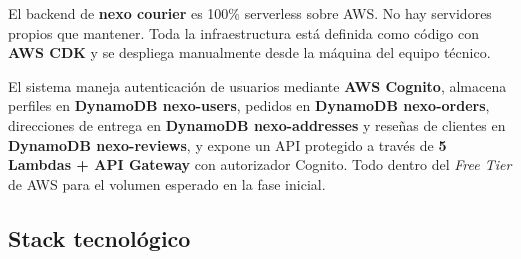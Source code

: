 \documentclass[12pt,a4paper]{article}
\begin{document}
\begin{nexobox}
El backend de \textbf{nexo courier} es 100\% serverless sobre AWS. No hay servidores
propios que mantener. Toda la infraestructura está definida como código con
\textbf{AWS CDK} y se despliega manualmente desde la máquina del equipo técnico.
\end{nexobox}

\vspace{0.5em}
El sistema maneja autenticación de usuarios mediante \textbf{AWS Cognito}, almacena
perfiles en \textbf{DynamoDB nexo-users}, pedidos en \textbf{DynamoDB nexo-orders},
direcciones de entrega en \textbf{DynamoDB nexo-addresses} y reseñas de clientes en
\textbf{DynamoDB nexo-reviews}, y expone un API protegido a través de
\textbf{5 Lambdas + API Gateway} con autorizador Cognito.
Todo dentro del \textit{Free Tier} de AWS para el volumen esperado en la fase inicial.

\subsection{Stack tecnológico}
\end{document}
